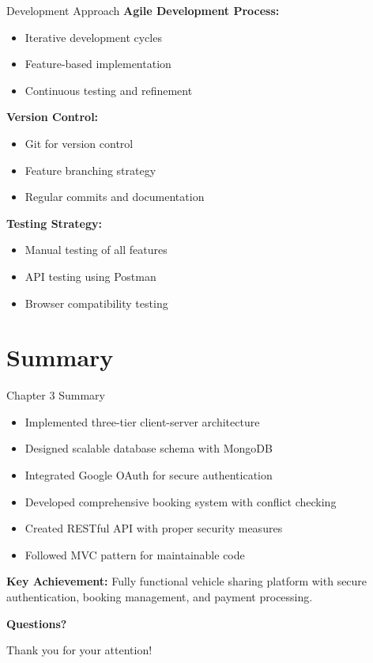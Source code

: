\documentclass{beamer}
\begin{document}
\begin{frame}{Development Approach}
\textbf{Agile Development Process:}
\begin{itemize}
    \item Iterative development cycles
    \item Feature-based implementation
    \item Continuous testing and refinement
\end{itemize}

\vspace{0.3cm}
\textbf{Version Control:}
\begin{itemize}
    \item Git for version control
    \item Feature branching strategy
    \item Regular commits and documentation
\end{itemize}

\vspace{0.3cm}
\textbf{Testing Strategy:}
\begin{itemize}
    \item Manual testing of all features
    \item API testing using Postman
    \item Browser compatibility testing
\end{itemize}
\end{frame}

\section{Summary}

\begin{frame}{Chapter 3 Summary}
\begin{itemize}
    \item Implemented three-tier client-server architecture
    \item Designed scalable database schema with MongoDB
    \item Integrated Google OAuth for secure authentication
    \item Developed comprehensive booking system with conflict checking
    \item Created RESTful API with proper security measures
    \item Followed MVC pattern for maintainable code
\end{itemize}

\vspace{0.5cm}
\centering
\textbf{Key Achievement:} Fully functional vehicle sharing platform with secure authentication, booking management, and payment processing.
\end{frame}

\begin{frame}
\centering
\Huge \textbf{Questions?}

\vspace{1cm}
\Large Thank you for your attention!
\end{frame}
\end{document}
